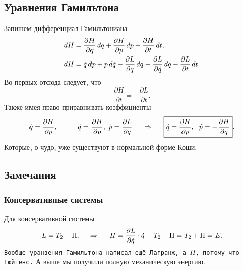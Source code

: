 \subsection{Уравнения Гамильтона}

Запишем дифференциал Гамильтониана
\begin{align*}
    d H &= \frac{\partial H}{\partial q} \, d q  +\frac{\partial H}{\partial p} \, d p + \frac{\partial H}{\partial t} \, d t, \\
    d H &= \dot{q} \, d p + p \, d \dot{q} - \frac{\partial L}{\partial q} \, d q - \frac{\partial L}{\partial \dot{q}} \, d \dot{q} - \frac{\partial L}{\partial t} \, d t.
\end{align*}
Во-первых отсюда следует, что
\begin{equation}
    \frac{\partial H}{\partial t} = - \frac{\partial L}{\partial t}.
\end{equation}
Также имея право приравнивать коэффициенты
\begin{equation}
    \dot{q} = \frac{\partial H}{\partial p},
    \hspace{1 cm}
    \dot{q} = \frac{\partial H}{\partial p},
    \ 
    \dot{p} = \frac{\partial L}{\partial q}
    \hspace{0.5cm} \Rightarrow \hspace{0.5cm}
    \boxed{
        \dot{q} = \frac{\partial H}{\partial p}, \ \ 
        \dot{p} = - \frac{\partial H}{\partial q} 
    }
    .
\end{equation}
Которые, о чудо, уже существуют в нормальной форме Коши. 


\subsection*{Замечания}

\subsubsection*{Консервативные системы}

Для консервативной системы
\begin{equation}
    L = T_2 - \Pi,
    \hspace{0.5cm} \Rightarrow \hspace{0.5cm}
    H = \frac{\partial L}{\partial \dot{q}} \cdot \dot{q} - T_2 + \Pi = T_2 + \Pi = E.
\end{equation}
\texttt{Вообще уранвения Гамильтона написал ещё Лагранж, а $H$, потому что Гюйгенс.} А выше мы получили полную механическую энергию. 

